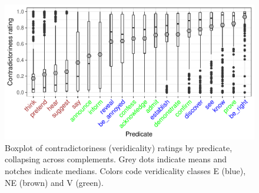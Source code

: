 \documentclass[12pt,fleqn]{article}
\newcommand{\6}{\mbox{$[\hspace*{-.6mm}[$}}
\newcommand{\9}{\mbox{$]\hspace*{-.6mm}]$}}
\begin{document}
%
%
%
%
%
%
%
%
%
%
%
%
%

\newpage

\begin{figure}[h!]
\centering

\includegraphics[width=.46\paperwidth]{../results/2-veridicality2/graphs/boxplot-veridicality}

\caption{\footnotesize{Boxplot of contradictoriness (veridicality) ratings by predicate, collapsing across complements. Grey dots indicate means and notches indicate medians. Colors code veridicality classes E (blue), NE (brown) and V (green).}}
\label{f-veridicality}
\end{figure}
\end{document}
